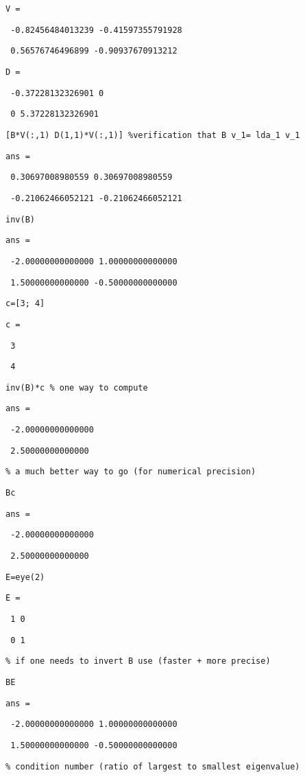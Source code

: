 \documentclass[12pt,a4paper]{article}
\begin{document}
\texttt{V =}

\texttt{\ -0.82456484013239 -0.41597355791928}

\texttt{\ 0.56576746496899 -0.90937670913212}

\texttt{D =}

\texttt{\ -0.37228132326901 0}

\texttt{\ 0 5.37228132326901}

\texttt{[B*V(:,1) D(1,1)*V(:,1)] \%verification that B v\_1= lda\_1 v\_1}

\texttt{ans =}

\texttt{\ 0.30697008980559 0.30697008980559}

\texttt{\ -0.21062466052121 -0.21062466052121}

\texttt{inv(B)}

\texttt{ans =}

\texttt{\ -2.00000000000000 1.00000000000000}

\texttt{\ 1.50000000000000 -0.50000000000000}

\texttt{c=[3; 4]}

\texttt{c =}

\texttt{\ 3}

\texttt{\ 4}

\texttt{inv(B)*c \% one way to compute}

\texttt{ans =}

\texttt{\ -2.00000000000000}

\texttt{\ 2.50000000000000}

\texttt{\% a much better way to go (for numerical precision)}

\texttt{B\TEXTsymbol{\backslash}c}

\texttt{ans =}

\texttt{\ -2.00000000000000}

\texttt{\ 2.50000000000000}

\texttt{E=eye(2)}

\texttt{E =}

\texttt{\ 1 0}

\texttt{\ 0 1}

\texttt{\% if one needs to invert B use (faster + more precise)}

\texttt{B\TEXTsymbol{\backslash}E}

\texttt{ans =}

\texttt{\ -2.00000000000000 1.00000000000000}

\texttt{\ 1.50000000000000 -0.50000000000000}

\texttt{\% condition number (ratio of largest to smallest eigenvalue)}
\end{document}
